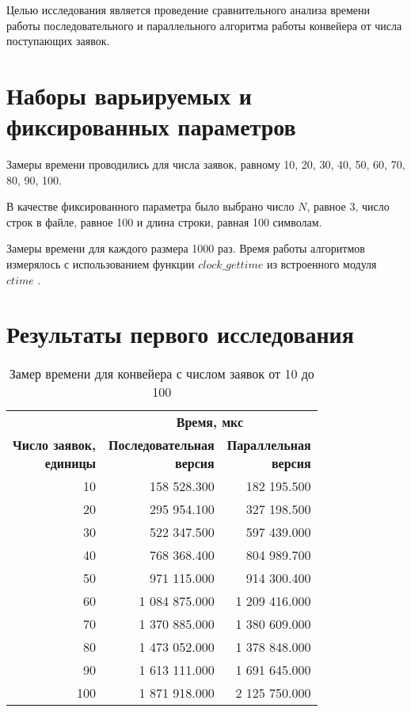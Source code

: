 Целью исследования является проведение сравнительного анализа времени работы последовательного и параллельного алгоритма работы конвейера от числа поступающих заявок.

\section*{Наборы варьируемых и фиксированных параметров}

Замеры времени проводились для числа заявок, равному 10, 20, 30, 40, 50, 60, 70, 80, 90, 100.

В качестве фиксированного параметра было выбрано число $N$, равное 3, число строк в файле, равное 100 и длина строки, равная 100 символам.

Замеры времени для каждого размера 1000 раз. Время работы алгоритмов измерялось с использованием функции $clock\_gettime$ из встроенного модуля $ctime$ \cite{cpu_time_func}.  

\section*{Результаты первого исследования}

\begin{table}[ht]
	\small
	\begin{center}
		\begin{threeparttable}
			\caption{Замер времени для конвейера с числом заявок от 10 до 100}
			\label{tbl:time}
			\begin{tabular}{|r|r|r|}
				\hline
				& \multicolumn{2}{c|}{\bfseries Время, мкс} \\ \cline{2-3}
				\bfseries \makecell{Число заявок, \\ единицы} & \bfseries \makecell{Последовательная \\ версия} & \bfseries \makecell{Параллельная \\ версия} \\ \cline{2-3}
				\hline
				10 & 158 528.300 & 182 195.500 \\
				\hline
				20 & 295 954.100 & 327 198.500 \\
				\hline
				30 & 522 347.500 & 597 439.000  \\
				\hline
				40 & 768 368.400 & 804 989.700 \\
				\hline
				50 & 971 115.000 & 914 300.400  \\
				\hline
				60 & 1 084 875.000 & 1 209 416.000  \\
				\hline
				70 & 1 370 885.000 & 1 380 609.000  \\
				\hline
				80 & 1 473 052.000 & 1 378 848.000  \\
				\hline
				90 & 1 613 111.000 & 1 691 645.000  \\
				\hline
				100 & 1 871 918.000 & 2 125 750.000  \\
				\hline
			\end{tabular}	
		\end{threeparttable}
	\end{center}
\end{table}

